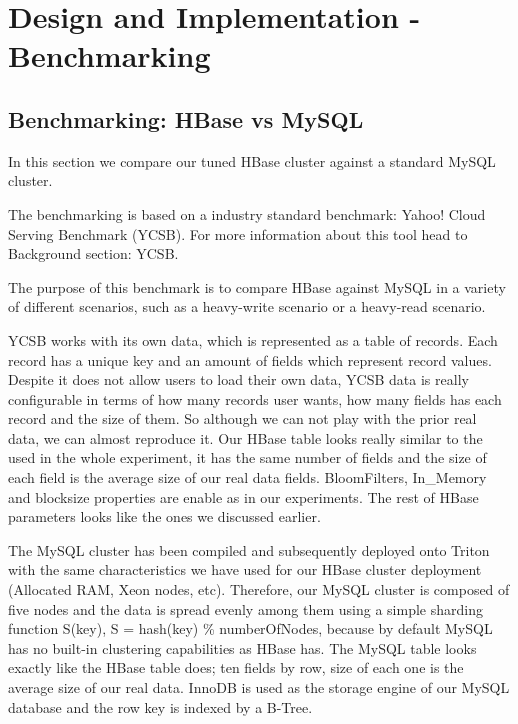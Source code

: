 \chapter{Design and Implementation - Benchmarking}
\label{chapter:Design and Implementation - Benchmarking}
 
\section{Benchmarking: HBase vs MySQL}

In this section we compare our tuned HBase cluster against a standard MySQL cluster.

\bigskip

The benchmarking is based on a industry standard benchmark: Yahoo! Cloud Serving Benchmark (YCSB). For more information about this tool head to Background section: YCSB.
\par
The purpose of this benchmark is to compare HBase against MySQL in a variety of different scenarios, such as a heavy-write scenario or a heavy-read scenario. 
\par
YCSB works with its own data, which is represented as a table of records. Each record has a unique key and an amount of fields which represent record values. Despite it does not allow users to load their own data, YCSB data is really configurable in terms of how many records user wants, how many fields has each record and the size of them. So although we can not play with the prior real data, we can almost reproduce it. Our HBase table looks really similar to the used in the whole experiment, it has the same number of fields and the size of each field is the average size of our real data fields. BloomFilters, In\_Memory and blocksize properties are enable as in our experiments. The rest of HBase parameters looks like the ones we discussed earlier.
\par
The MySQL cluster has been compiled and subsequently deployed onto Triton with the same characteristics we have used for our HBase cluster deployment (Allocated RAM, Xeon nodes, etc). Therefore, our MySQL cluster is composed of five nodes and the data is spread evenly among them using a simple sharding function S(key), S = hash(key) \% numberOfNodes, because by default MySQL has no built-in clustering capabilities as HBase has. The MySQL table looks exactly like the HBase table does; ten fields by row, size of each one is the average size of our real data. InnoDB is used as the storage engine of our MySQL database and the row key is indexed by a B-Tree. 

